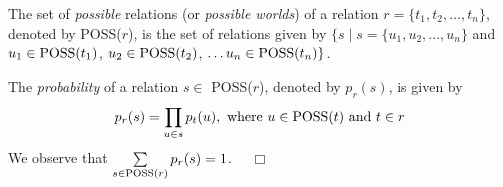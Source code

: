 
\begin{definition}
\begin{rm}
The set of {\em possible} relations (or {\em possible worlds}) 
of a relation $r = \{t_1, t_2, \ldots, t_n\}$, denoted by POSS($r$),
is the set of relations given by
$\{s \mid s = \{u_1, u_2, ..., u_n\}$ and 
$u_1 \in {\rm POSS}(t_1)$, $u_2 \in {\rm POSS}(t_2)$,
$\ldots u_n \in {\rm POSS}(t_n)\}$.

The {\em probability} of a relation $s \in$ POSS($r$),
denoted by $p_r(s)$, is given by 
\begin{displaymath}
p_r(s) = \prod_{u \in s} p_t(u), \mbox{ where } u \in {\rm POSS}(t) 
\mbox{ and } t \in r 
\end{displaymath}
We observe that $\sum\limits_{s \in {\rm POSS}(r)} p_r(s) = 1$. $\quad\Box$
\end{rm}
\end{definition}
\medskip



\medskip

